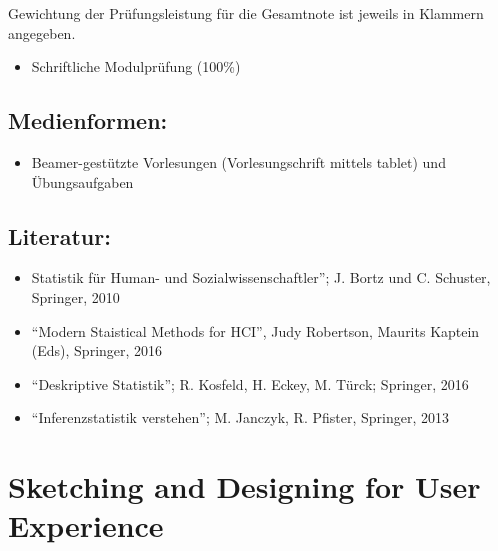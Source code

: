 Gewichtung der Prüfungsleistung für die Gesamtnote ist jeweils in
Klammern angegeben.

\begin{itemize}
\tightlist
\item
  Schriftliche Modulprüfung (100\%)
\end{itemize}

\section*{Medienformen:\label{/mi-2017/modulbeschreibungen-master/MA_HCI_Modul_Statistical_Methods_for_HCI}}\label{medienformenpathlabelmi-2017modulbeschreibungen-mastermaux5fhciux5fmodulux5fstatisticalux5fmethodsux5fforux5fhci}

\begin{itemize}
\tightlist
\item
  Beamer-gestützte Vorlesungen (Vorlesungschrift mittels tablet) und
  Übungsaufgaben
\end{itemize}

\section*{Literatur:\label{/mi-2017/modulbeschreibungen-master/MA_HCI_Modul_Statistical_Methods_for_HCI}}\label{literaturpathlabelmi-2017modulbeschreibungen-mastermaux5fhciux5fmodulux5fstatisticalux5fmethodsux5fforux5fhci}

\begin{itemize}
\tightlist
\item
  Statistik für Human- und Sozialwissenschaftler''; J. Bortz und C.
  Schuster, Springer, 2010
\item
  ``Modern Staistical Methods for HCI'', Judy Robertson, Maurits Kaptein
  (Eds), Springer, 2016
\item
  ``Deskriptive Statistik''; R. Kosfeld, H. Eckey, M. Türck; Springer,
  2016
\item
  ``Inferenzstatistik verstehen''; M. Janczyk, R. Pfister, Springer,
  2013
\end{itemize}

\chapter{Sketching and Designing for User
Experience\label{/mi-2017/modulbeschreibungen-master/MA_HCI_Sketching_and_Designing_for_User_Experience}}\label{sketching-and-designing-for-user-experiencepathlabelmi-2017modulbeschreibungen-mastermaux5fhciux5fsketchingux5fandux5fdesigningux5fforux5fuserux5fexperience}

